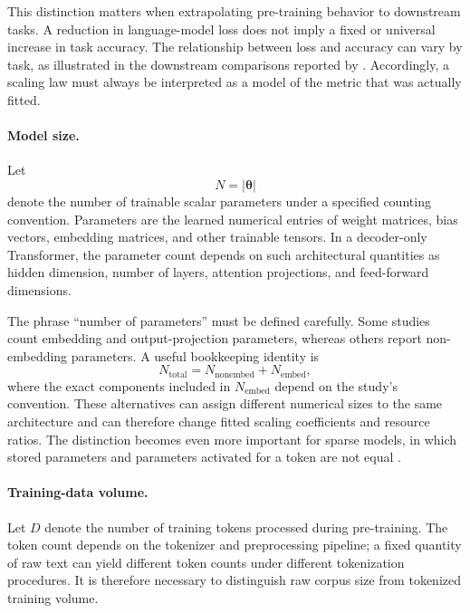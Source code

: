 This distinction matters when extrapolating pre-training behavior to
downstream tasks. A reduction in language-model loss does not imply a fixed or
universal increase in task accuracy. The relationship between loss and
accuracy can vary by task, as illustrated in the downstream comparisons
reported by \textcite{Bian2025InferenceEfficient}. Accordingly, a scaling law
must always be interpreted as a model of the metric that was actually fitted.

\paragraph{Model size.}
Let
\begin{equation}
    N=|\boldsymbol{\theta}|
    \label{eq:scaling-parameter-count}
\end{equation}
denote the number of trainable scalar parameters under a specified counting
convention. Parameters are the learned numerical entries of weight matrices,
bias vectors, embedding matrices, and other trainable tensors. In a
decoder-only Transformer, the parameter count depends on such architectural
quantities as hidden dimension, number of layers, attention projections, and
feed-forward dimensions.

The phrase ``number of parameters'' must be defined carefully. Some studies
count embedding and output-projection parameters, whereas others report
non-embedding parameters. A useful bookkeeping identity is
\begin{equation}
    N_{\mathrm{total}}
    =
    N_{\mathrm{nonembed}}+N_{\mathrm{embed}},
    \label{eq:scaling-parameter-count-convention}
\end{equation}
where the exact components included in \(N_{\mathrm{embed}}\) depend on the
study's convention. These alternatives can assign different numerical sizes
to the same architecture and can therefore change fitted scaling coefficients
and resource ratios. The distinction becomes even more important for sparse
models, in which stored parameters and parameters activated for a token are
not equal \parencite{Li2025MisFitting,Ludziejewski2025JointMoE}.

\paragraph{Training-data volume.}
Let \(D\) denote the number of training tokens processed during pre-training.
The token count depends on the tokenizer and preprocessing pipeline; a fixed
quantity of raw text can yield different token counts under different
tokenization procedures. It is therefore necessary to distinguish raw corpus
size from tokenized training volume.


